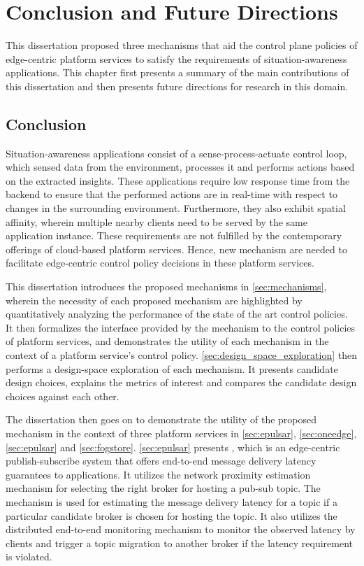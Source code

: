 \chapter{Conclusion and Future Directions}
\label{sec:conclusion}
This dissertation proposed three mechanisms that aid the control plane policies of edge-centric platform services to satisfy the requirements of situation-awareness applications. This chapter first presents a summary of the main contributions of this dissertation and then presents future directions for research in this domain.

\section{Conclusion}
Situation-awareness applications consist of a sense-process-actuate control loop, which sensed data from the environment, processes it and performs actions based on the extracted insights. These applications require low response time from the backend to ensure that the performed actions are in real-time with respect to changes in the surrounding environment. Furthermore, they also exhibit spatial affinity, wherein multiple nearby clients need to be served by the same application instance. These requirements are not fulfilled by the contemporary offerings of cloud-based platform services. Hence, new mechanism are needed to facilitate edge-centric control policy decisions in these platform services. 
\par This dissertation introduces the proposed mechanisms in \cref{sec:mechanisms}, wherein the necessity of each proposed mechanism are highlighted by quantitatively analyzing the performance of the state of the art control policies. It then formalizes the interface provided by the mechanism to the control policies of platform services, and demonstrates the utility of each mechanism in the context of a platform service's control policy. \cref{sec:design_space_exploration} then performs a design-space exploration of each mechanism. It presents candidate design choices, explains the metrics of interest and compares the candidate design choices against each other. 
\par The dissertation then goes on to demonstrate the utility of the proposed mechanism in the context of three platform services in \cref{sec:epulsar}, \cref{sec:oneedge}, \cref{sec:epulsar} and \cref{sec:fogstore}. \cref{sec:epulsar} presents \epulsar{}, which is an edge-centric publish-subscribe system that offers end-to-end message delivery latency guarantees to applications. It utilizes the network proximity estimation mechanism for selecting the right broker for hosting a pub-sub topic. The mechanism is used for estimating the message delivery latency for a topic if a particular candidate broker is chosen for hosting the topic. It also utilizes the distributed end-to-end monitoring mechanism to monitor the observed latency by clients and trigger a topic migration to another broker if the latency requirement is violated.
